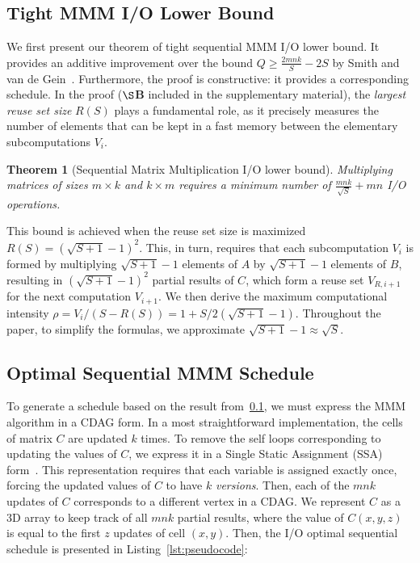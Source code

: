\documentclass[sigplan,review,anonymous,10pt]{acmart}\settopmatter{printfolios=true,printccs=false,printacmref=false}
\newtheorem{thm}{Theorem}
\begin{document}
\subsection{Tight MMM I/O Lower Bound} 
\label{sec:seqOpt}
We first present our theorem of tight sequential
MMM I/O lower bound. It provides an additive improvement over the bound $Q \ge 
\frac{2mnk}{S} - 2S$ by Smith and van de 
Gein~\cite{tightMMM}. Furthermore, the proof is constructive: it provides a 
corresponding schedule. In the proof ($\S$\textbf{B} included in the 
supplementary material), the \emph{largest reuse set size} $R(S)$ plays a 
fundamental 
role, as it precisely measures the number of elements that can be kept in a 
fast memory between the elementary subcomputations $V_i$.

\begin{thm}[Sequential Matrix Multiplication I/O lower bound] 
	Multiplying matrices of sizes $m \times k$ and $k \times m $ requires a 
	minimum 
	number of $\frac{mnk}{\sqrt{S}} + mn$ I/O operations.
	\label{thm:seqlowbounds}
\end{thm}

This bound is achieved when the reuse set size is maximized $R(S) = (\sqrt{S + 
1} -1)^2$. This, in turn, requires that each subcomputation $V_i$ is formed by 
multiplying $\sqrt{S+1} -1$ elements of 
$A$ 
by $\sqrt{S+1} -1$ elements of $B$, resulting in $ (\sqrt{S + 1} -1)^2$ partial 
results of $C$, which form a reuse set $V_{R,i+1}$ for the next computation 
$V_{i+1}$.
 We then derive the maximum computational intensity 
$\rho = V_i/(S - R(S)) = 1 + S/2(\sqrt{S+1} - 1)$.
Throughout the paper, to simplify the formulas, we approximate $\sqrt{S + 1} -1 
\approx \sqrt{S}$.

\subsection{Optimal Sequential MMM Schedule} 
\label{sec:seqSched}
To generate a schedule based on the result from~\cref{sec:seqOpt}, we must 
express the MMM algorithm in a CDAG form. In a most straightforward 
implementation, the
cells of matrix $C$ are updated $k$ times. 
To remove the self loops corresponding to updating the values
of $C$, we express it in a Single Static Assignment (SSA) form~\cite{ssa}. This 
representation requires that each variable is assigned exactly once, forcing 
the updated values of $C$ to have $k$ \emph{versions}. Then, each of the $mnk$
updates of $C$ corresponds to a different vertex in a CDAG. We 
represent $C$ as a 3D array to keep track of all $mnk$ partial results, where 
the value of $C(x,y,z)$ is equal to the first $z$ updates of cell $(x,y)$.  
Then, the I/O optimal sequential schedule is presented in 
Listing~\ref{lst:pseudocode}:
\end{document}
